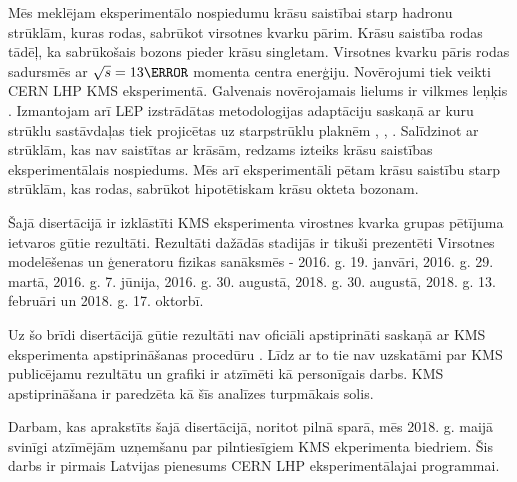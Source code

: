 Mēs meklējam eksperimentālo nospiedumu krāsu saistībai starp hadronu \gls{strūklām}, kuras rodas, sabrūkot \gls{virsotnes kvarku} pārim. Krāsu saistība rodas tādēļ, ka sabrūkošais \PW bozons pieder krāsu \gls{singletam}. Virsotnes kvarku pāris rodas \Pp\Pp sadursmēs ar $\sqrt{s}=13\TeV$ momenta centra enerģiju. Novērojumi tiek veikti CERN \gls{LHP} \gls{KMS} eksperimentā. Galvenais novērojamais lielums ir \gls{vilkmes leņķis} \cite{Gallicchio:2010sw}. Izmantojam arī \gls{LEP} izstrādātas metodologijas adaptāciju saskaņā ar kuru strūklu sastāvdaļas tiek projicētas uz starpstrūklu plaknēm \cite{Abbiendi:2005es}, \cite{Abdallah:2006uq}, \cite{Achard:2003pe}. Salīdzinot ar strūklām, kas nav saistītas ar krāsām, redzams izteiks krāsu saistības eksperimentālais nospiedums. Mēs arī eksperimentāli pētam krāsu saistību starp strūklām, kas rodas, sabrūkot hipotētiskam krāsu okteta \PW bozonam. 

Šajā disertācijā ir izklāstīti KMS eksperimenta virostnes kvarka grupas pētījuma ietvaros gūtie rezultāti. Rezultāti dažādās stadijās ir tikuši prezentēti Virsotnes modelēšenas un ģeneratoru fizikas sanāksmēs - 2016. g. 19. janvāri, 2016. g. 29. martā, 2016. g. 7. jūnija, 2016. g. 30. augustā, 2018. g. 30. augustā, 2018. g. 13. februāri un 2018. g. 17. oktorbī.

Uz šo brīdi disertācijā gūtie rezultāti nav oficiāli apstiprināti saskaņā ar KMS eksperimenta apstiprināšanas procedūru \cite{twiki:PhysicsApprovals}. Līdz ar to tie nav uzskatāmi par KMS publicējamu rezultātu un grafiki ir atzīmēti kā personīgais darbs. KMS apstiprināšana ir paredzēta kā šīs analīzes turpmākais solis.

Darbam, kas aprakstīts šajā disertācijā, noritot pilnā sparā, mēs 2018. g. maijā svinīgi atzīmējām uzņemšanu par pilntiesīgiem KMS ekperimenta biedriem. Šis darbs ir pirmais Latvijas pienesums CERN LHP eksperimentālajai programmai.
